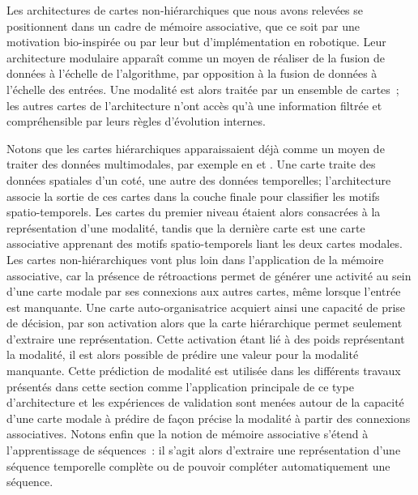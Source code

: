 \documentclass[../main]{subfiles}
\begin{document}
{Les architectures de cartes non-hiérarchiques que nous avons relevées se positionnent dans un cadre de mémoire associative, que ce soit par une motivation bio-inspirée ou par leur but d'implémentation en robotique.
Leur architecture modulaire apparaît comme un moyen de réaliser de la fusion de données à l'échelle de l'algorithme, par opposition à la fusion de données à l'échelle des entrées. Une modalité est alors traitée par un ensemble de cartes~; les autres cartes de l'architecture n'ont accès qu'à une information filtrée et compréhensible par leurs règles d'évolution internes. 


Notons que les cartes hiérarchiques apparaissaient déjà comme un moyen de traiter des données multimodales, par exemple en \cite{mici_self-organizing_2018} et \cite{nawaratne_hierarchical_2020-1}. 
Une carte traite des données spatiales d'un coté, une autre des données temporelles; l'architecture associe la sortie de ces cartes dans la couche finale pour classifier les motifs spatio-temporels. Les cartes du premier niveau étaient alors consacrées à la représentation d'une modalité, tandis que la dernière carte est une carte associative apprenant des motifs spatio-temporels liant les deux cartes modales.
Les cartes non-hiérarchiques vont plus loin dans l'application de la mémoire associative, car la présence de rétroactions permet de générer une activité au sein d'une carte modale par ses connexions aux autres cartes, même lorsque l'entrée est manquante.
Une carte auto-organisatrice acquiert ainsi une capacité de prise de décision, par son activation alors que la carte hiérarchique permet seulement d'extraire une représentation.
Cette activation étant lié à des poids représentant la modalité, il est alors possible de prédire une valeur pour la modalité manquante. 
Cette prédiction de modalité est utilisée dans les différents travaux présentés dans cette section comme l'application principale de ce type d'architecture et les expériences de validation sont menées autour de la capacité d'une carte modale à prédire de façon précise la modalité à partir des connexions associatives.
Notons enfin que la notion de mémoire associative s'étend à l'apprentissage de séquences~: il s'agit alors d'extraire une représentation d'une séquence temporelle complète ou de pouvoir compléter automatiquement une séquence.

}
\end{document}
